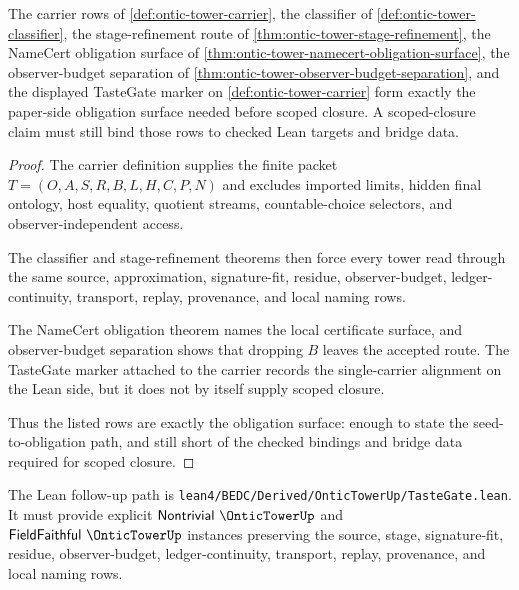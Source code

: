 \begin{theorem}
\label{thm:ontic-tower-obligation-closure-surface}
The carrier rows of \autoref{def:ontic-tower-carrier}, the classifier of \autoref{def:ontic-tower-classifier}, the stage-refinement route of \autoref{thm:ontic-tower-stage-refinement}, the NameCert obligation surface of \autoref{thm:ontic-tower-namecert-obligation-surface}, the observer-budget separation of \autoref{thm:ontic-tower-observer-budget-separation}, and the displayed TasteGate marker on \autoref{def:ontic-tower-carrier} form exactly the paper-side obligation surface needed before scoped closure. A scoped-closure claim must still bind those rows to checked Lean targets and bridge data.
\end{theorem}
\begin{proof}
The carrier definition supplies the finite packet $T=(O,A,S,R,B,L,H,C,P,N)$ and excludes imported limits, hidden final ontology, host equality, quotient streams, countable-choice selectors, and observer-independent access.

The classifier and stage-refinement theorems then force every tower read through the same source, approximation, signature-fit, residue, observer-budget, ledger-continuity, transport, replay, provenance, and local naming rows.

The NameCert obligation theorem names the local certificate surface, and observer-budget separation shows that dropping $B$ leaves the accepted route. The TasteGate marker attached to the carrier records the single-carrier alignment on the Lean side, but it does not by itself supply scoped closure.

Thus the listed rows are exactly the obligation surface: enough to state the seed-to-obligation path, and still short of the checked bindings and bridge data required for scoped closure.
\end{proof}

The Lean follow-up path is \texttt{lean4/BEDC/Derived/OnticTowerUp/TasteGate.lean}. It must provide explicit $\mathsf{Nontrivial}\ \OnticTowerUp$ and $\mathsf{FieldFaithful}\ \OnticTowerUp$ instances preserving the source, stage, signature-fit, residue, observer-budget, ledger-continuity, transport, replay, provenance, and local naming rows.


